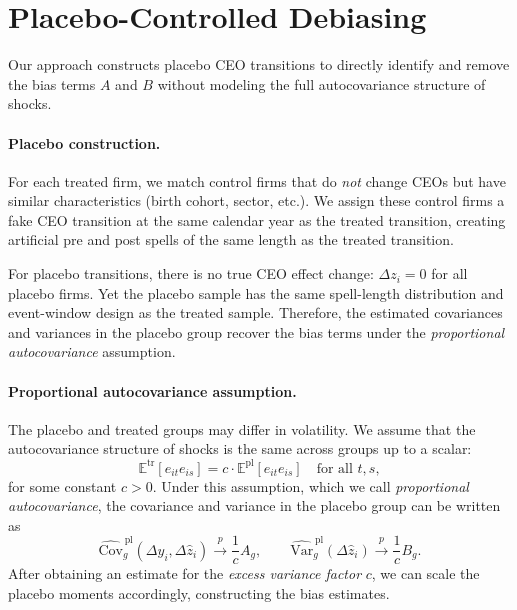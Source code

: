 \documentclass[11pt,a4paper]{article}
\newcommand{\Var}{\text{Var}}
\newcommand{\Cov}{\text{Cov}}
\begin{document}
\section{Placebo-Controlled Debiasing} 

Our approach constructs placebo CEO transitions to directly identify and remove the bias terms $A$ and $B$ without modeling the full autocovariance structure of shocks.

\paragraph{Placebo construction.} For each treated firm, we match control firms that do \emph{not} change CEOs but have similar characteristics (birth cohort, sector, etc.). We assign these control firms a fake CEO transition at the same calendar year as the treated transition, creating artificial pre and post spells of the same length as the treated transition.

For placebo transitions, there is no true CEO effect change: $\Delta z_i = 0$ for all placebo firms. Yet the placebo sample has the same spell-length distribution and event-window design as the treated sample. Therefore, the estimated covariances and variances in the placebo group recover the bias terms under the \emph{proportional autocovariance} assumption.

\paragraph{Proportional autocovariance assumption.} The placebo and treated groups may differ in volatility. We assume that the autocovariance structure of shocks is the same across groups up to a scalar: 
\begin{equation}
  \mathbb{E}^{\text{tr}}[e_{it} e_{is}] = c \cdot \mathbb{E}^{\text{pl}}[e_{it} e_{is}] \quad \text{for all } t,s,
\end{equation}
for some constant $c>0$. Under this assumption, which we call \emph{proportional autocovariance}, the covariance and variance in the placebo group can be written as 
\begin{equation}
\widehat{\Cov}_g^{\,\text{pl}}(\Delta y_i,\Delta \hat z_i) \xrightarrow{p} \frac{1}{c} A_g,\qquad \widehat{\Var}_g^{\,\text{pl}}(\Delta \hat z_i) \xrightarrow{p} \frac{1}{c} B_g.
\end{equation}
After obtaining an estimate for the \emph{excess variance factor} $c$, we can scale the placebo moments accordingly,  constructing the bias estimates.
\end{document}
